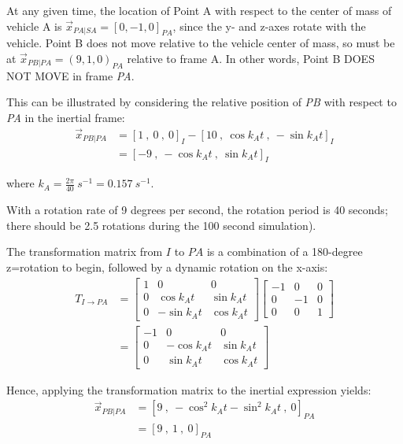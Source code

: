 \begin{description}
\begin{enumerate}
  At any given time, the location of Point A with respect to the center of
  mass of vehicle A is $\vec x_{PA|SA} = [0, -1, 0]_{PA}$, since the y- and z-axes rotate with
  the vehicle.  Point B does not move relative to the vehicle center of
  mass, so must be at $\vec x_{PB|PA} = (9, 1, 0)_{PA}$ relative to frame A.  In other words,
  Point B DOES NOT MOVE in frame \textit{PA}.
       
  This can be illustrated by considering the relative position of \textit{PB} with respect to \textit{PA} in the inertial frame:
  \begin{equation*}
  \begin{split}
    \vec x_{PB|PA} &= [1\ ,\ 0\ ,\ 0]_I - [10\ ,\ \cos k_A t\ ,\ -\sin k_A t]_{I} \\
                 & = [-9\ ,\ -\cos k_A t\ ,\ \sin k_A t]_{I}
  \end{split}
  \end{equation*}

  where $k_A = \frac{2 \pi}{40}\ s^{-1} = 0.157\ s^{-1}$.
  
  With a rotation rate of 9 degrees per second, the rotation period is 40 seconds; there should be 2.5 rotations during the 100 second simulation).
   
     
  The transformation matrix from $I$ to $PA$ is a combination of a 180-degree z=rotation to begin, followed by a dynamic rotation on the x-axis:
  \begin{equation}
   \begin{split}
  T_{I\rightarrow PA} &=\begin{bmatrix} 1 & 0 & 0 \\ 0 & \cos k_A t & \sin k_A t \\  0 & -\sin k_A t & \cos k_A t \end{bmatrix}
  \begin{bmatrix} -1 & 0 & 0 \\ 0 & -1 & 0 \\ 0 & 0 & 1\end{bmatrix} \\
  &= 
  \begin{bmatrix} -1 & 0 & 0 \\ 0 & -\cos k_A t & \sin k_A t \\  0 & \sin k_A t & \cos k_A t \end{bmatrix}
  \end{split}
 \end{equation}\label{eqn:rel_verif_TIPA}

   Hence, applying the transformation matrix to the inertial expression yields:
   \begin{equation*}
   \begin{split}
        \vec x_{PB|PA} &= [9\ ,\ -\cos^2 k_A t -\sin^2 k_A t\ ,\ 0]_{PA} \\
                     &= [9\ ,\ 1\ ,\ 0]_{PA}
   \end{split}
   \end{equation*}


\end{enumerate}
\end{description}
